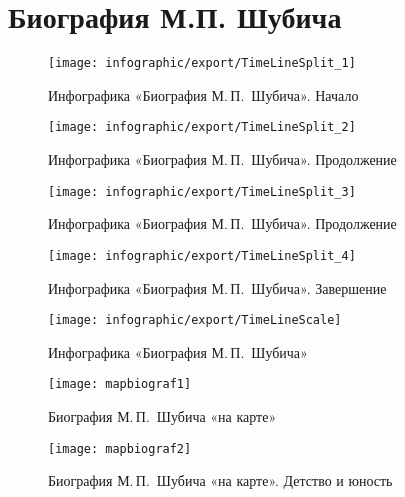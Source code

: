 ﻿\section{Биография М.П. Шубича}

\begin{figure}[H]
\texttt{[image: infographic/export/TimeLineSplit\_1]}
\caption{Инфографика «Биография М.\,П.~Шубича». Начало}
\label{fig:TimeLineSplit}
\end{figure}

\begin{figure}[t]
\ContinuedFloat %
\texttt{[image: infographic/export/TimeLineSplit\_2]}
\caption{Инфографика «Биография М.\,П.~Шубича». Продолжение}
\end{figure}

\begin{figure}[t]
\ContinuedFloat %
\texttt{[image: infographic/export/TimeLineSplit\_3]}
\caption{Инфографика «Биография М.\,П.~Шубича». Продолжение}
\end{figure}

\begin{figure}[t]
\ContinuedFloat %
\texttt{[image: infographic/export/TimeLineSplit\_4]}
\caption{Инфографика «Биография М.\,П.~Шубича». Завершение}
\end{figure}

\FloatBarrier

\begin{figure}[H]
\texttt{[image: infographic/export/TimeLineScale]}
\caption{Инфографика «Биография М.\,П.~Шубича»}
\label{fig:TimeLineScale}
\end{figure}



\begin{figure}[h]
\texttt{[image: mapbiograf1]}
\caption{Биография М.\,П.~Шубича «на карте»}
\label{fig:mapbiograf1}
\end{figure}

\begin{figure}[h]
\texttt{[image: mapbiograf2]}
\caption{Биография М.\,П.~Шубича «на карте». Детство и юность}
\label{fig:mapbiograf2}
\end{figure}

